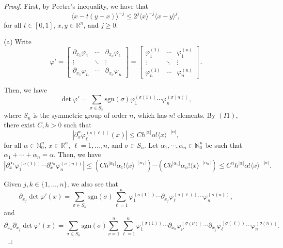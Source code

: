 \documentclass[10pt,a4paper]{amsart}
\begin{document}
\begin{proof}
	First, by Peetre's inequality, we have that
	\begin{equation}\label{peetre}
		\langle x-t(y-x)\rangle^{-j} \leq 2^j\langle x\rangle^{-j}\langle x-y\rangle^{j},
	\end{equation}
	for all $t\in[0,1]$, $x,y\in\mathbb{R}^n$, and $j\geq 0$.
	
	\medskip\noindent
	(a) Write
	\[\varphi' = \begin{bmatrix} \partial_{x_1}\varphi_1 & \cdots & \partial_{x_n}\varphi_1 \\ \vdots & \ddots & \vdots \\ \partial_{x_1}\varphi_n & \cdots & \partial_{x_n}\varphi_n \end{bmatrix} = \begin{bmatrix} \varphi_1^{(1)} & \cdots & \varphi_1^{(n)} \\ \vdots & \ddots & \vdots \\ \varphi_n^{(1)} & \cdots & \varphi_n^{(n)} \end{bmatrix}.\]
	
	Then, we have
	\[\det\varphi' = \sum_{\sigma\in S_n}\mathrm{sgn}(\sigma)\varphi_1^{(\sigma(1))}\cdots\varphi_n^{(\sigma(n))},\]
	where $S_n$ is the symmetric group of order $n$, which has $n!$ elements. By $(I1)$, there exist $C,h>0$ such that
	\[|\partial_x^\alpha\varphi_\ell^{(\sigma(\ell))}(x)|\leq Ch^{|\alpha|}\alpha!\langle x\rangle^{-|\alpha|},\]
	for all $\alpha\in\mathbb{N}_0^n$, $x\in\mathbb{R}^n$, $\ell=1,\dots,n$, and $\sigma\in S_n$. Let $\alpha_1,\cdots,\alpha_n\in\mathbb{N}_0^n$ be such that $\alpha_1+\cdots+\alpha_n=\alpha$. Then, we have
	\begin{equation*}
		|\partial_x^{\alpha_1}\varphi_1^{(\sigma(1))}\cdots \partial_x^{\alpha_n}\varphi_n^{(\sigma(n))}| \leq (Ch^{|\alpha_1|}\alpha_1!\langle x\rangle^{-|\alpha_1|})\cdots (Ch^{|\alpha_n|}\alpha_n!\langle x\rangle^{-|\alpha_n|}) \leq C^nh^{|\alpha|}\alpha!\langle x\rangle^{-|\alpha|}.
	\end{equation*}
	
	Given $j,k\in\{1,\dots,n\}$, we also see that
	\[\partial_{x_j}\det\varphi'(x) = 
	\sum_{\sigma\in S_n}\mathrm{sgn}(\sigma)\sum_{\ell=1}^n \varphi_1^{(\sigma(1))}\cdots \partial_{x_j}\varphi_{\ell}^{(\sigma(\ell))}\cdots \varphi_n^{(\sigma(n))},\]
	and
	\[\partial_{x_k}\partial_{x_j}\det\varphi'(x) = \sum_{\sigma\in S_n}\mathrm{sgn}(\sigma)\sum_{\nu=1}^n \sum_{\ell=1}^n \varphi_1^{(\sigma(1))}\cdots \partial_{x_k}\varphi_{\nu}^{(\sigma(\nu))} \cdots \partial_{x_j}\varphi_{\ell}^{(\sigma(\ell))}\cdots \varphi_n^{(\sigma(n))}.\]
	

\end{proof}
\end{document}
